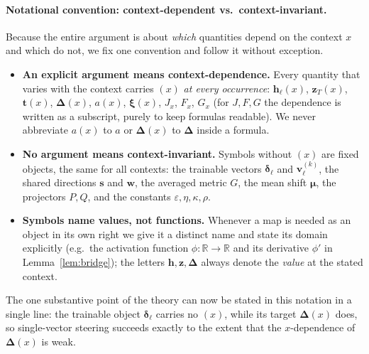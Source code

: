 \documentclass[11pt]{article}
\newcommand{\R}{\mathbb{R}}
\newcommand{\bh}{\mathbf{h}}
\newcommand{\bz}{\mathbf{z}}
\newcommand{\bt}{\mathbf{t}}
\newcommand{\bs}{\mathbf{s}}
\newcommand{\bv}{\mathbf{v}}
\newcommand{\bw}{\mathbf{w}}
\newcommand{\bdelta}{\bm{\delta}}
\newcommand{\bDelta}{\bm{\Delta}}
\newcommand{\bmu}{\bm{\mu}}
\newcommand{\bxi}{\bm{\xi}}
\begin{document}
\paragraph{Notational convention: context-dependent vs.\ context-invariant.}
Because the entire argument is about \emph{which} quantities depend on the context $x$ and which do
not, we fix one convention and follow it without exception.

\begin{itemize}[leftmargin=1.4em,itemsep=2pt]
\item \textbf{An explicit argument means context-dependence.} Every quantity that varies with the
context carries $(x)$ \emph{at every occurrence}: $\bh_\ell(x)$, $\bz_T(x)$, $\bt(x)$, $\bDelta(x)$,
$a(x)$, $\bxi(x)$, $J_x$, $F_x$, $G_x$ (for $J,F,G$ the dependence is written as a subscript, purely
to keep formulas readable). We never abbreviate $a(x)$ to $a$ or $\bDelta(x)$ to $\bDelta$ inside a
formula.
\item \textbf{No argument means context-invariant.} Symbols without $(x)$ are fixed objects, the
same for all contexts: the trainable vectors $\bdelta_\ell$ and $\bv_\ell^{(k)}$, the shared
directions $\bs$ and $\bw$, the averaged metric $G$, the mean shift $\bmu$, the projectors $P,Q$,
and the constants $\varepsilon,\eta,\kappa,\rho$.
\item \textbf{Symbols name values, not functions.} Whenever a map is needed as an object in its own
right we give it a distinct name and state its domain explicitly (e.g.\ the activation function
$\phi:\R\to\R$ and its derivative $\phi'$ in Lemma~\ref{lem:bridge}); the letters $\bh,\bz,\bDelta$
always denote the \emph{value} at the stated context.
\end{itemize}

\noindent
The one substantive point of the theory can now be stated in this notation in a single line: the
trainable object $\bdelta_\ell$ carries no $(x)$, while its target $\bDelta(x)$ does, so
single-vector steering succeeds exactly to the extent that the $x$-dependence of $\bDelta(x)$ is
weak.
\end{document}
